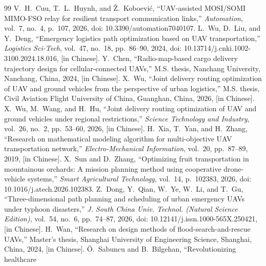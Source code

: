 \documentclass[journal]{IEEEtran}
\begin{document}
\begin{thebibliography}{99}
\footnotesize
\setlength{\itemsep}{0pt plus 0.3pt}\setlength{\parsep}{0pt}
 V.~H.~Cuu, T.~L.~Huynh, and \v{Z}.~Koboevi\'c, ``UAV-assisted
MOSI/SOMI MIMO-FSO relay for resilient transport communication links,''
\emph{Automation}, vol.~7, no.~4, p.~107, 2026, doi: 10.3390/automation7040107.
 L.~Wu, D.~Liu, and Y.~Deng, ``Emergency logistics path
optimization based on UAV transportation,'' \emph{Logistics Sci-Tech}, vol.~47,
no.~18, pp.~86--90, 2024, doi: 10.13714/j.cnki.1002-3100.2024.18.016, [in Chinese].
 Y.~Chen, ``Radio-map-based cargo delivery trajectory design
for cellular-connected UAVs,'' M.S. thesis, Nanchang University, Nanchang,
China, 2024, [in Chinese].
 X.~Wu, ``Joint delivery routing optimization of UAV and ground
vehicles from the perspective of urban logistics,'' M.S. thesis, Civil Aviation
Flight University of China, Guanghan, China, 2026, [in Chinese].
 X.~Wu, M.~Wang, and H.~Hu, ``Joint delivery routing optimization
of UAV and ground vehicles under regional restrictions,'' \emph{Science
Technology and Industry}, vol.~26, no.~2, pp.~53--60, 2026, [in Chinese].
 H.~Xia, T.~Yan, and H.~Zhang, ``Research on mathematical
modeling algorithm for multi-objective UAV transportation network,'' \emph{Electro-Mechanical
Information}, vol.~20, pp.~87--89, 2019, [in Chinese].
 X.~Sun and D.~Zhang, ``Optimizing fruit transportation in
mountainous orchards: A mission planning method using cooperative drone-vehicle
systems,'' \emph{Smart Agricultural Technology}, vol.~14, p.~102383, 2026,
doi: 10.1016/j.atech.2026.102383.
 Z.~Dong, Y.~Qian, W.~Ye, W.~Li, and T.~Gu, ``Three-dimensional
path planning and scheduling of urban emergency UAVs under typhoon disasters,''
\emph{J. South China Univ. Technol. (Natural Science Edition)}, vol.~54, no.~6,
pp.~74--87, 2026, doi: 10.12141/j.issn.1000-565X.250421, [in Chinese].
 H.~Wan, ``Research on design methods of flood-search-and-rescue
UAVs,'' Master's thesis, Shanghai University of Engineering Science, Shanghai, China,
2024, [in Chinese].
 \"O.~Sabuncu and B.~Bilgehan, ``Revolutionizing healthcare

\end{thebibliography}
\end{document}
